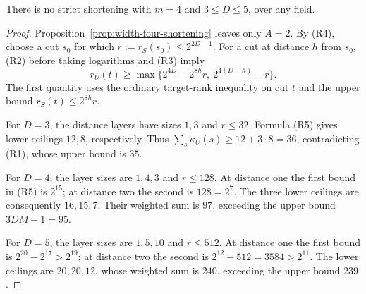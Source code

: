 \begin{proposition}
\label{prop:width-four-three-five}
There is no strict shortening with $m=4$ and $3\le D\le5$,
over any field.
\end{proposition}
\begin{proof}
Proposition~\ref{prop:width-four-shortening} leaves only
$A=2$.  By (R4), choose a cut $s_0$ for which
$r:=r_S(s_0)\le2^{2D-1}$.  For a cut at distance $h$ from
$s_0$, (R2) before taking logarithms and (R3) imply
\[
 r_U(t)\ge
 \max\{2^{4D}-2^{8h}r,\ 2^{4(D-h)}-r\}.          \tag{R5}
\]
The first quantity uses the ordinary target-rank inequality
on cut $t$ and the upper bound $r_S(t)\le2^{8h}r$.

For $D=3$, the distance layers have sizes $1,3$ and
$r\le32$.  Formula (R5) gives lower ceilings $12,8$,
respectively.  Thus
$\sum_s\kappa_U(s)\ge12+3\cdot8=36$, contradicting
(R1), whose upper bound is $35$.

For $D=4$, the layer sizes are $1,4,3$ and $r\le128$.
At distance one the first bound in (R5) is $2^{15}$;
at distance two the second is $128=2^7$.
The three lower ceilings are consequently $16,15,7$.
Their weighted sum is $97$, exceeding the upper bound
$3DM-1=95$.

For $D=5$, the layer sizes are $1,5,10$ and $r\le512$.
At distance one the first bound is
$2^{20}-2^{17}>2^{19}$; at distance two the second is
$2^{12}-512=3584>2^{11}$.
The lower ceilings are $20,20,12$, whose weighted sum is
$240$, exceeding the upper bound $239$.
\end{proof}

